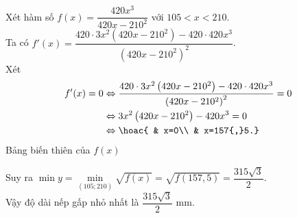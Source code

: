 \begin{bt}
{Xét hàm số $f(x)=\dfrac{420x^3}{420x-210^2}$ với $105<x<210$.\\
Ta có $f'(x)=\dfrac{420\cdot3x^2\left(420x-210^2\right)-420\cdot420x^3}{\left(420x-210^2\right)^2}$.\\
Xét
\[\begin{aligned}
f'(x)=0
&\Leftrightarrow \dfrac{420\cdot3x^2\left(420x-210^2\right)-420\cdot420x^3}{\left(420x-210^2\right)^2}=0\\&\Leftrightarrow 3x^2\left(420x-210^2\right)-420x^3=0\\&\Leftrightarrow \hoac{ & x=0\\ & x=157{,}5.}
\end{aligned}\]
Bảng biến thiên của $f(x)$
\begin{center}
\end{center}	
Suy ra $\min y=\min\limits_{(105;210)} \sqrt{f(x)}=\sqrt{f(157{,}5)}=\dfrac{315\sqrt{3}}{2}$. \\
Vậy độ dài nếp gấp nhỏ nhất là $\dfrac{315\sqrt{3}}{2}$ mm. \\
}
\end{bt}

